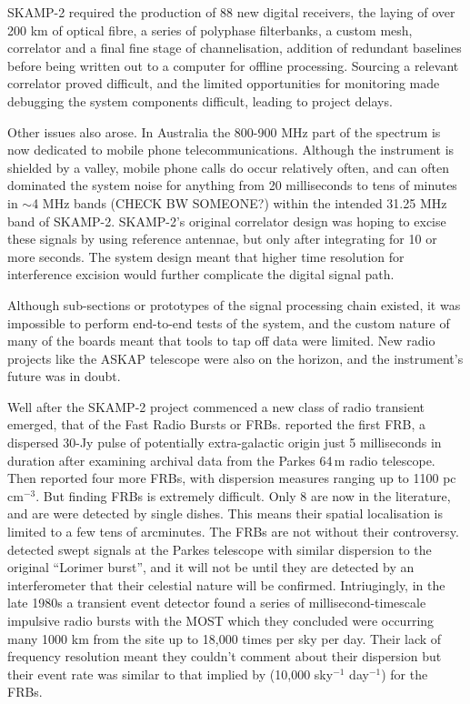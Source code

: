 SKAMP-2 required the production of 88 new digital receivers, the laying of over 200 km of optical fibre, a series of polyphase filterbanks, a custom mesh, correlator and a final fine stage of channelisation, addition of redundant baselines before being written out to a computer for offline processing\citep{Adams_2004}. Sourcing a relevant correlator proved difficult, and the limited opportunities for monitoring made debugging the system components difficult, leading to project delays.

Other issues also arose. In Australia the 800-900 MHz part of the spectrum is now dedicated to mobile phone telecommunications. Although the instrument is shielded by a valley, mobile phone calls do occur relatively often, and can often dominated the system noise for anything from 20 milliseconds to tens of minutes in $\sim$4 MHz bands (CHECK BW SOMEONE?) within the intended 31.25 MHz band of SKAMP-2. SKAMP-2's original correlator design was hoping to excise these signals by using reference antennae, but only after integrating for 10 or more seconds. The system design meant that higher time resolution for interference excision would further complicate the digital signal path. 

Although sub-sections or prototypes of the signal processing chain existed, it was impossible to perform end-to-end tests of the system, and the custom nature of many of the boards meant that tools to tap off data were limited.  New radio projects like the ASKAP telescope were also on the horizon, and the instrument's future was in doubt.

Well after the SKAMP-2 project commenced a new class of radio transient emerged, that of the Fast Radio Bursts or FRBs. \citep{Lorimer_2007} reported the first FRB, a dispersed 30-Jy pulse of potentially extra-galactic origin just 5 milliseconds in duration after examining archival data from the Parkes 64\,m radio telescope. Then \citep{Thornton_2013} reported four more FRBs, with dispersion measures ranging up to 1100 pc cm$^{-3}$. But finding FRBs is extremely difficult. Only 8 are now in the literature, and are were detected by single dishes. This means their spatial localisation is limited to a few tens of arcminutes. 
The FRBs are not without their controversy. \cite{Burke_Spolaor_2011} detected swept signals at the Parkes telescope with similar dispersion to the original ``Lorimer burst'', and it will not be until they are detected by an interferometer that their celestial nature will be confirmed. Intriugingly, in the late 1980s a transient event detector found a series of millisecond-timescale impulsive radio bursts with the MOST which they concluded were occurring many 1000 km from the site up to 18,000 times per sky per day\cite{Lovell_2008}. Their lack of frequency resolution meant they couldn't comment about their dispersion but their event rate was similar to that implied by \citep{Thornton_2013} (10,000 sky$^{-1}$ day$^{-1}$) for the FRBs.

